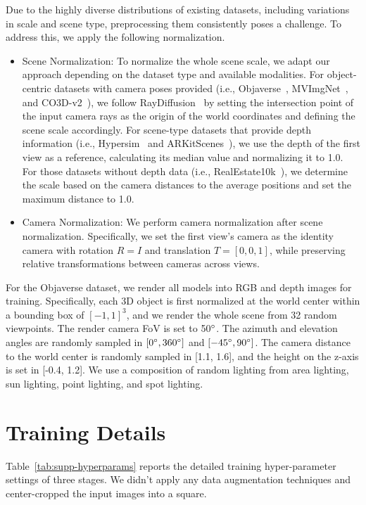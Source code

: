 Due to the highly diverse distributions of existing datasets, including variations in scale and scene type, preprocessing them consistently poses a challenge. To address this, we apply the following normalization.
\begin{itemize}
    \item Scene Normalization:  
    To normalize the whole scene scale, we adapt our approach depending on the dataset type and available modalities. For object-centric datasets with camera poses provided (i.e., Objaverse~\cite{deitke2023objaverse}, MVImgNet~\cite{yu2023mvimgnet}, and CO3D-v2~\cite{reizenstein21co3d}), we follow RayDiffusion~\cite{zhang2024cameras} by setting the intersection point of the input camera rays as the origin of the world coordinates and defining the scene scale accordingly. For scene-type datasets that provide depth information (i.e., Hypersim~\cite{roberts2021hypersim} and ARKitScenes~\cite{baruch2021arkitscenes}), we use the depth of the first view as a reference, calculating its median value and normalizing it to 1.0. For those datasets without depth data (i.e., RealEstate10k~\cite{zhou2018stereo}), we determine the scale based on the camera distances to the average positions and set the maximum distance to 1.0.

    \item Camera Normalization:  
    We perform camera normalization after scene normalization. Specifically, we set the first view’s camera as the identity camera with rotation \( R = I \) and translation \( T = [0, 0, 1] \), while preserving relative transformations between cameras across views.
\end{itemize}

  For the Objaverse dataset, we render all models into RGB and depth images for training. Specifically, each 3D object is first normalized at the world center within a bounding box of $[-1, 1]^3$, and we render the whole scene from 32 random viewpoints. The render camera FoV is set to 50$\degree$. The azimuth and elevation angles are randomly sampled in $[0\degree, 360\degree]$ and $[-45\degree, 90\degree]$. The camera distance to the world center is randomly sampled in [1.1, 1.6], and the height on the z-axis is set in [-0.4, 1.2]. We use a composition of random lighting from area lighting, sun lighting, point lighting, and spot lighting.


\section{Training Details}
\label{sec:supp-training}
Table~\ref{tab:supp-hyperparams} reports the detailed training hyper-parameter settings of three stages. We didn't apply any data augmentation techniques and center-cropped the input images into a square.

